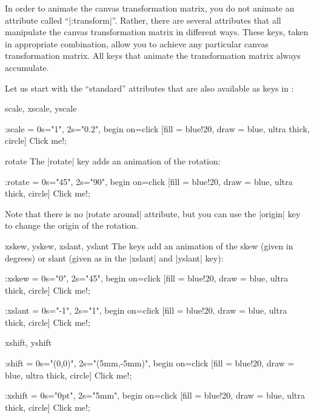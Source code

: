 In order to animate the canvas transformation matrix, you do not
animate an attribute called ``|:transform|''. Rather, there are
several attributes that all manipulate the canvas transformation
matrix in different ways. These keys, taken in appropriate
combination, allow you to achieve any particular canvas transformation
matrix. All keys that animate the transformation matrix always
accumulate.

Let us start with the ``standard'' attributes that are also available
as keys in \tikzname: 

\begin{tikzanimateattribute}{scale, xscale, yscale}
\begin{codeexample}[animation list={0.5,1,1.5,2}]
\tikz \node :scale = { 0s="1", 2s="0.2", begin on=click}
  [fill = blue!20, draw = blue, ultra thick, circle] {Click me!}; 
\end{codeexample}
\end{tikzanimateattribute}

\begin{tikzanimateattribute}{rotate}
  The |rotate| key adds an animation of the rotation:
\begin{codeexample}[animation list={0.5,1,1.5,2}]
\tikz \node :rotate = { 0s="45", 2s="90", begin on=click}
  [fill = blue!20, draw = blue, ultra thick, circle] {Click me!}; 
\end{codeexample}
  Note that there is no |rotate around| attribute, but you can use the
  |origin| key to change the origin of the rotation.
\end{tikzanimateattribute}


\begin{tikzanimateattribute}{xskew, yskew, xslant, yslant}
  The keys add an animation of the skew (given in degrees) or slant
  (given as in the |xslant| and |yslant| key):
\begin{codeexample}[animation list={0.5,1,1.5,2}]
\tikz \node :xskew = { 0s="0", 2s="45", begin on=click}
  [fill = blue!20, draw = blue, ultra thick, circle] {Click me!}; 
\end{codeexample}
\begin{codeexample}[animation list={0.5,1,1.5,2}]
\tikz \node :xslant = { 0s="-1", 2s="1", begin on=click}
  [fill = blue!20, draw = blue, ultra thick, circle] {Click me!}; 
\end{codeexample}
\end{tikzanimateattribute}

\begin{tikzanimateattribute}{xshift, yshift}
\begin{codeexample}[animation list={0.5,1,1.5,2}]
\tikz \node :shift = { 0s="{(0,0)}", 2s="{(5mm,-5mm)}",
                       begin on=click}
  [fill = blue!20, draw = blue, ultra thick, circle] {Click me!}; 
\end{codeexample}
\begin{codeexample}[animation list={0.5,1,1.5,2}]
\tikz \node :xshift = { 0s="0pt", 2s="5mm", begin on=click}
  [fill = blue!20, draw = blue, ultra thick, circle] {Click me!}; 
\end{codeexample}
\end{tikzanimateattribute}

